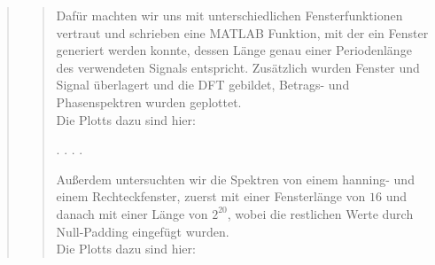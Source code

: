 \begin{quote}
\begin{quote}
        Dafür machten wir uns mit unterschiedlichen Fensterfunktionen vertraut
        und schrieben eine MATLAB Funktion, mit der ein Fenster generiert werden
        konnte, dessen Länge genau einer Periodenlänge des verwendeten Signals
        entspricht. Zusätzlich wurden Fenster und Signal überlagert und die DFT
        gebildet, Betrags- und Phasenspektren wurden geplottet.\\
        Die Plotts dazu sind hier:
        
        .
        .
        .
        .
        
        
        Außerdem untersuchten wir die Spektren von einem hanning- und einem
        Rechteckfenster, zuerst mit einer Fensterlänge von $16$ und danach mit
        einer Länge von $2^20$, wobei die restlichen Werte durch Null-Padding
        eingefügt wurden.\\
        Die Plotts dazu sind hier: 
        
        
    \end{quote}
\end{quote}


